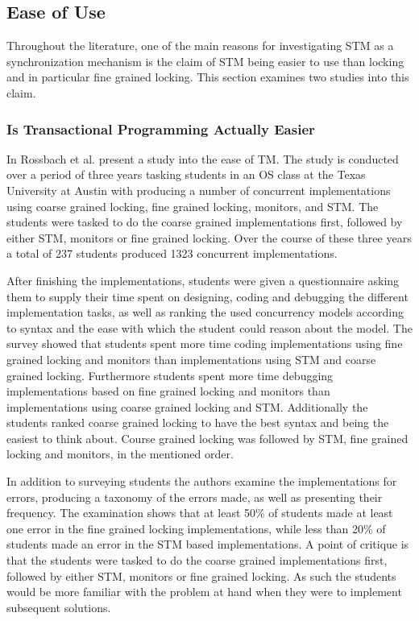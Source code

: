 \subsection{Ease of Use}
\label{sec:stm_ease_of_use}
Throughout the literature, one of the main reasons for investigating \ac{STM} as a synchronization mechanism is the claim of \ac{STM} being easier to use than locking and in particular fine grained locking. This section examines two studies into this claim.
\subsubsection{Is Transactional Programming Actually Easier}
\label{sec:stm_ease_rossbach}
In \cite{rossbach2010transactional} Rossbach et al. present a study into the ease of \ac{TM}. The study is conducted over a period of three years tasking students in an \ac{OS} class at the Texas University at Austin with producing a number of concurrent implementations using coarse grained locking, fine grained locking, monitors, and \ac{STM}. The students were tasked to do the coarse grained implementations first, followed by either \ac{STM}, monitors or fine grained locking. Over the course of these three years a total of 237 students produced 1323 concurrent implementations. 

After finishing the implementations, students were given a questionnaire asking them to supply their time spent on designing, coding and debugging the different implementation tasks, as well as ranking the used concurrency models according to syntax and the ease with which the student could reason about the model. The survey showed that students spent more time coding implementations using fine grained locking and monitors than implementations using \ac{STM} and coarse grained locking\cite[p. 51]{rossbach2010transactional}. Furthermore students spent more time debugging implementations based on fine grained locking and monitors than implementations using coarse grained locking and \ac{STM}\cite[p. 51]{rossbach2010transactional}. Additionally the students ranked coarse grained locking to have the best syntax and being the easiest to think about. Course grained locking was followed by \ac{STM}, fine grained locking and monitors, in the mentioned order.

In addition to surveying students the authors examine the implementations for errors, producing a taxonomy of the errors made, as well as presenting their frequency. The examination shows that at least 50\% of students made at least one error in the fine grained locking implementations, while less than 20\% of students made an error in the \ac{STM} based implementations. A point of critique is that the students were tasked to do the coarse grained implementations first, followed by either \ac{STM}, monitors or fine grained locking. As such the students would be more familiar with the problem at hand when they were to implement subsequent solutions.

